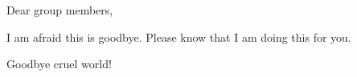 Dear group members,

I am afraid this is goodbye.
Please know that I am doing this for you.

Goodbye cruel world!